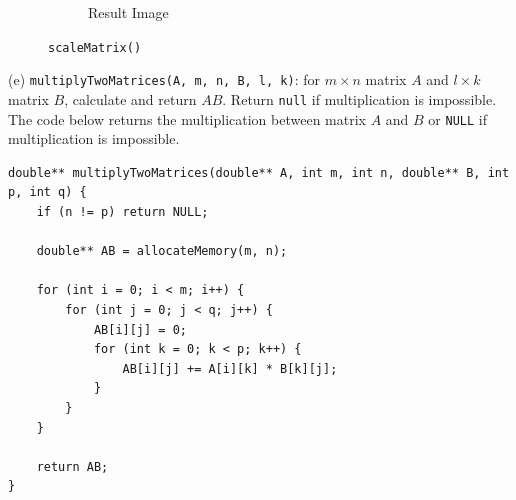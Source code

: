 \begin{figure}[h]
\begin{subfigure}[b]{0.45\textwidth}
        \caption{Result Image}
        \label{fig:image}
    \end{subfigure}
    \caption{\texttt{scaleMatrix()}}
\end{figure}
\pagebreak

(e) \texttt{multiplyTwoMatrices(A, m, n, B, l, k)}: for $m \times n$ matrix $A$ and $l \times k$ matrix $B$, calculate and return $AB$. Return \texttt{null} if multiplication is impossible.\\
The code below returns the multiplication between matrix $A$ and $B$ or \texttt{NULL} if multiplication is impossible.
\begin{verbatim}
double** multiplyTwoMatrices(double** A, int m, int n, double** B, int p, int q) {
    if (n != p) return NULL;
    
    double** AB = allocateMemory(m, n);

    for (int i = 0; i < m; i++) {
        for (int j = 0; j < q; j++) {
            AB[i][j] = 0;
            for (int k = 0; k < p; k++) {
                AB[i][j] += A[i][k] * B[k][j];
            }
        }
    }
    
    return AB;
}
\end{verbatim}
